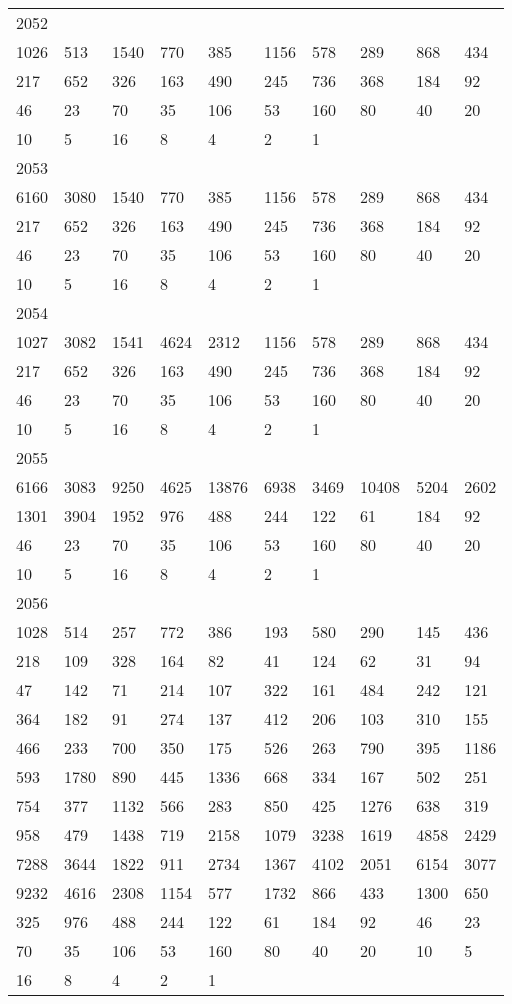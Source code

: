\begin{longtable}{*{10}{l}}
2052&&&&&&&&&\\
1026& 513& 1540& 770& 385& 1156& 578& 289& 868& 434\\
217& 652& 326& 163& 490& 245& 736& 368& 184& 92\\
46& 23& 70& 35& 106& 53& 160& 80& 40& 20\\
10& 5& 16& 8& 4& 2& 1& \\

2053&&&&&&&&&\\
6160& 3080& 1540& 770& 385& 1156& 578& 289& 868& 434\\
217& 652& 326& 163& 490& 245& 736& 368& 184& 92\\
46& 23& 70& 35& 106& 53& 160& 80& 40& 20\\
10& 5& 16& 8& 4& 2& 1& \\

2054&&&&&&&&&\\
1027& 3082& 1541& 4624& 2312& 1156& 578& 289& 868& 434\\
217& 652& 326& 163& 490& 245& 736& 368& 184& 92\\
46& 23& 70& 35& 106& 53& 160& 80& 40& 20\\
10& 5& 16& 8& 4& 2& 1& \\

2055&&&&&&&&&\\
6166& 3083& 9250& 4625& 13876& 6938& 3469& 10408& 5204& 2602\\
1301& 3904& 1952& 976& 488& 244& 122& 61& 184& 92\\
46& 23& 70& 35& 106& 53& 160& 80& 40& 20\\
10& 5& 16& 8& 4& 2& 1& \\

2056&&&&&&&&&\\
1028& 514& 257& 772& 386& 193& 580& 290& 145& 436\\
218& 109& 328& 164& 82& 41& 124& 62& 31& 94\\
47& 142& 71& 214& 107& 322& 161& 484& 242& 121\\
364& 182& 91& 274& 137& 412& 206& 103& 310& 155\\
466& 233& 700& 350& 175& 526& 263& 790& 395& 1186\\
593& 1780& 890& 445& 1336& 668& 334& 167& 502& 251\\
754& 377& 1132& 566& 283& 850& 425& 1276& 638& 319\\
958& 479& 1438& 719& 2158& 1079& 3238& 1619& 4858& 2429\\
7288& 3644& 1822& 911& 2734& 1367& 4102& 2051& 6154& 3077\\
9232& 4616& 2308& 1154& 577& 1732& 866& 433& 1300& 650\\
325& 976& 488& 244& 122& 61& 184& 92& 46& 23\\
70& 35& 106& 53& 160& 80& 40& 20& 10& 5\\
16& 8& 4& 2& 1& \\


\end{longtable}

